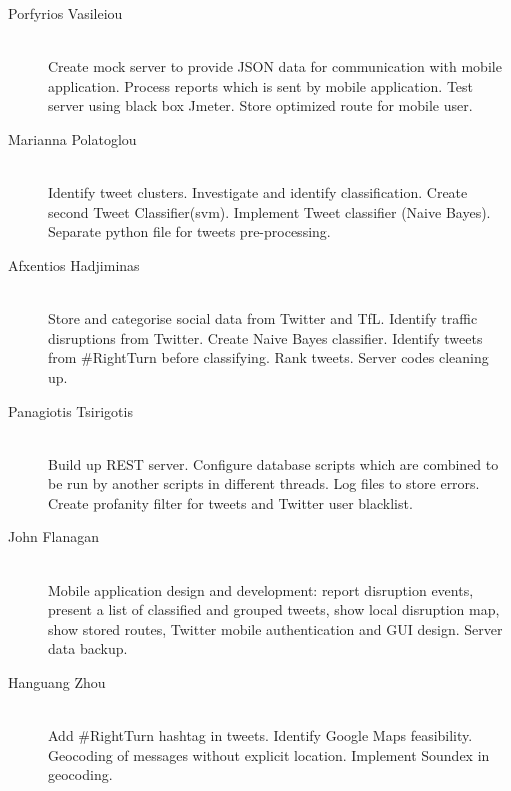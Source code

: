 \begin{description}
  \item[Porfyrios Vasileiou] \hfill \\
  Create mock server to provide JSON data for
  communication with mobile application. Process reports which is sent by mobile application. Test
  server using black box Jmeter. Store optimized route for mobile user.

  \item[Marianna Polatoglou] \hfill \\
  Identify tweet clusters. Investigate and identify
  classification. Create second Tweet Classifier(svm). Implement Tweet classifier (Naive Bayes). Separate python file for tweets pre-processing.

  \item[Afxentios Hadjiminas] \hfill \\
  Store and categorise social data from Twitter and
  TfL. Identify traffic disruptions from Twitter. Create Naive Bayes
  classifier. Identify tweets from \#RightTurn before classifying. Rank tweets. Server codes cleaning up.

  \item[Panagiotis Tsirigotis] \hfill \\
  Build up REST server. Configure database scripts which are combined to be run by another scripts in different threads. Log files to store errors. Create profanity filter for tweets and Twitter user
  blacklist. 

  \item[John Flanagan] \hfill \\
  Mobile application design and development: report disruption
  events, present a list of classified and grouped tweets, show local
  disruption map, show stored routes, Twitter mobile authentication and GUI design. Server data backup.

  \item[Hanguang Zhou] \hfill \\
  Add \#RightTurn hashtag in tweets.
  Identify Google Maps feasibility.
  Geocoding of messages without explicit location.
  Implement Soundex in geocoding.
\end{description}

